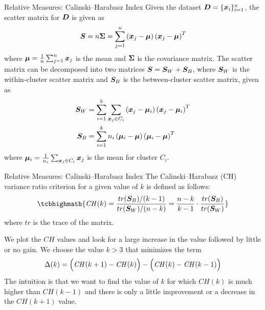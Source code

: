 \begin{frame}{Relative Measures: Calinski--Harabasz Index}
  Given the dataset ${\boldsymbol D} =\{{\boldsymbol x}_i\}_{i=1}^n$,
the scatter matrix for ${\boldsymbol D}$ is given as
\begin{align*}
  {\boldsymbol S} = n{\bm \Sigma} = \sum_{j=1}^n \left({\boldsymbol x}_{j} - {\bm \mu}\right)
  \left({\boldsymbol x}_{j} - {\bm \mu}\right)^T
\end{align*}
where ${\bm \mu} = \tfrac{1}{n} \sum_{j=1}^n {\boldsymbol x}_{j} $ is the mean and ${\bm \Sigma}$
is the covariance matrix.  The scatter matrix can
be decomposed into two matrices ${\boldsymbol S} = {\boldsymbol S}_W + {\boldsymbol S}_B$,
where ${\boldsymbol S}_W$ is the within-cluster scatter
matrix and ${\boldsymbol S}_B$ is the between-cluster scatter matrix, given
as
\begin{align*}
  {\boldsymbol S}_W & = \sum_{i=1}^k \sum_{{\boldsymbol x}_{j} \in C_i}
  \left({\boldsymbol x}_{j} - {\bm \mu}_i\right) \left({\boldsymbol x}_{j} - {\bm \mu}_i\right)^T\\
  {\boldsymbol S}_B & = \sum_{i=1}^k n_i
  \left({\bm \mu}_i - {\bm \mu}\right) \left({\bm \mu}_i - {\bm \mu}\right)^T
\end{align*}
where ${\bm \mu}_i = \tfrac{1}{n_i} \sum_{{\boldsymbol x}_{j} \in C_i} {\boldsymbol x}_{j}$ is
the mean for cluster $C_i$.
\end{frame}


\begin{frame}{Relative Measures: Calinski--Harabasz Index}
The Calinski--Harabasz (CH) variance ratio criterion for a given value of $k$
is def\/{i}ned as follows:
\begin{align*}
\tcbhighmath{
  \mathit{CH}(k) = \frac{tr(\bS_B)/(k-1)}{tr(\bS_W)/(n-k)} =
  \frac{n-k}{k-1} \cdot \frac{tr(\bS_B)}{tr(\bS_W)}
}
\end{align*}
where $tr$ is the trace of the matrix.

\medskip
We plot the $\mathit{CH}$ values and look for a large increase in the
value followed by little or no gain. We choose
the value $k>3$ that minimizes the term
\begin{align*}
  \Delta(k) = \Bigl(\mathit{CH}(k+1)-\mathit{CH}(k)\Bigr) - \Bigl(\mathit{CH}(k)-\mathit{CH}(k-1)\Bigr)
\end{align*}
The intuition is that we want to f\/{i}nd the value of $k$ for which $\mathit{CH}(k)$ is much higher than
$\mathit{CH}(k-1)$ and there is only a
little improvement or a decrease in the
$\mathit{CH}(k + 1)$ value.

\end{frame}



